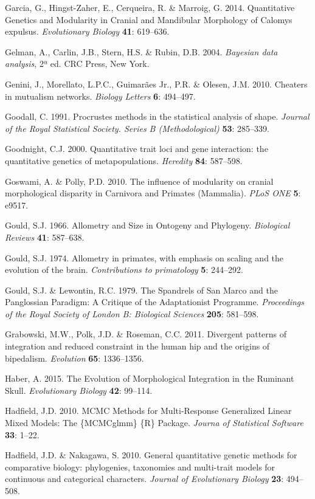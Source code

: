 \documentclass[12pt,twoside]{report}
\begin{document}
Garcia, G., Hingst-Zaher, E., Cerqueira, R. \& Marroig, G. 2014.
Quantitative Genetics and Modularity in Cranial and Mandibular
Morphology of Calomys expulsus. \emph{Evolutionary Biology} \textbf{41}:
619--636.

Gelman, A., Carlin, J.B., Stern, H.S. \& Rubin, D.B. 2004.
\emph{Bayesian data analysis}, 2ª ed. CRC Press, New York.

Genini, J., Morellato, L.P.C., Guimarães Jr., P.R. \& Olesen, J.M. 2010.
Cheaters in mutualism networks. \emph{Biology Letters} \textbf{6}:
494--497.

Goodall, C. 1991. Procrustes methods in the statistical analysis of
shape. \emph{Journal of the Royal Statistical Society. Series B
(Methodological)} \textbf{53}: 285--339.

Goodnight, C.J. 2000. Quantitative trait loci and gene interaction: the
quantitative genetics of metapopulations. \emph{Heredity} \textbf{84}:
587--598.

Goswami, A. \& Polly, P.D. 2010. The influence of modularity on cranial
morphological disparity in Carnivora and Primates (Mammalia). \emph{PLoS
ONE} \textbf{5}: e9517.

Gould, S.J. 1966. Allometry and Size in Ontogeny and Phylogeny.
\emph{Biological Reviews} \textbf{41}: 587--638.

Gould, S.J. 1974. Allometry in primates, with emphasis on scaling and
the evolution of the brain. \emph{Contributions to primatology}
\textbf{5}: 244--292.

Gould, S.J. \& Lewontin, R.C. 1979. The Spandrels of San Marco and the
Panglossian Paradigm: A Critique of the Adaptationist Programme.
\emph{Proceedings of the Royal Society of London B: Biological Sciences}
\textbf{205}: 581--598.

Grabowski, M.W., Polk, J.D. \& Roseman, C.C. 2011. Divergent patterns of
integration and reduced constraint in the human hip and the origins of
bipedalism. \emph{Evolution} \textbf{65}: 1336--1356.

Haber, A. 2015. The Evolution of Morphological Integration in the
Ruminant Skull. \emph{Evolutionary Biology} \textbf{42}: 99--114.

Hadfield, J.D. 2010. MCMC Methods for Multi-Response Generalized Linear
Mixed Models: The \{MCMCglmm\} \{R\} Package. \emph{Journa of
Statistical Software} \textbf{33}: 1--22.

Hadfield, J.D. \& Nakagawa, S. 2010. General quantitative genetic
methods for comparative biology: phylogenies, taxonomies and multi-trait
models for continuous and categorical characters. \emph{Journal of
Evolutionary Biology} \textbf{23}: 494--508.
\end{document}
